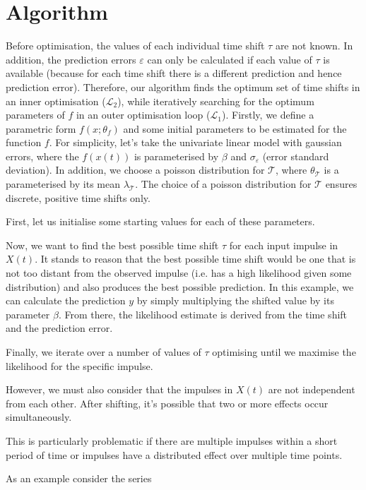 \documentclass[11pt]{amsart}
\begin{document}
\section{Algorithm}

Before optimisation, the values of each individual time shift $\tau$ are not known. In addition, the prediction errors $\varepsilon$ can only be calculated if each value of $\tau$ is available (because for each time shift there is a different prediction and hence prediction error). Therefore, our algorithm finds the optimum set of time shifts in an inner optimisation ($\mathcal{L}_2$), while iteratively searching for the optimum parameters of $f$ in an outer optimisation loop ($\mathcal{L}_1$). 
Firstly, we define a parametric form $f(x;\theta_f)$ and some initial parameters to be estimated for the function $f$. For simplicity, let's take the univariate linear model with gaussian errors, where the $f(x(t))$ is parameterised by $\beta$ and $\sigma_{\varepsilon}$ (error standard deviation). In addition, we choose a poisson distribution for $\mathcal{T}$, where $\theta_{\mathcal{T}}$ is a parameterised by its mean $\lambda_{\mathcal{T}}$. The choice of a poisson distribution for $\mathcal{T}$
ensures discrete, positive time shifts only.

First, let us initialise some starting values for each of these parameters.

Now, we want to find the best possible time shift $\tau$ for each input impulse in $X(t)$. It stands to reason that the best possible time shift would be one that is not too distant from the observed impulse (i.e. has a high likelihood given some distribution) and also produces the best possible prediction. In this example, we can calculate the prediction $y$ by simply multiplying the shifted value by its parameter $\beta$. From there, the likelihood estimate is derived from the time shift and the prediction error.

Finally, we iterate over a number of values of $\tau$ optimising until we maximise the likelihood for the specific impulse.

However, we must also consider that the impulses in $X(t)$ are not independent from each other. After shifting, it's possible that two or more effects occur simultaneously.

This is particularly problematic if there are multiple impulses within a short period of time or impulses have a distributed effect over multiple time points. 

As an example consider the series 
\end{document}
